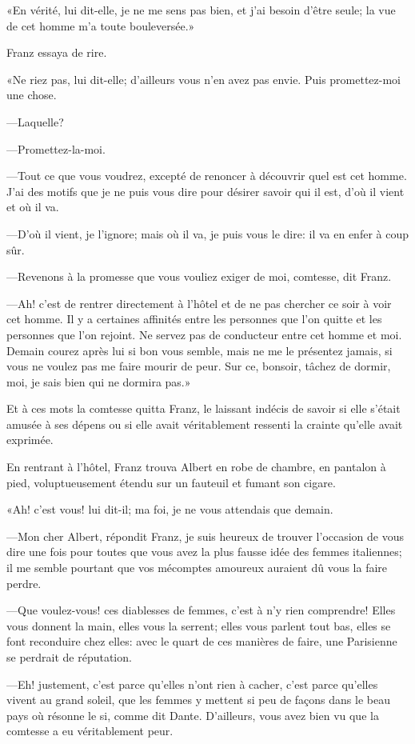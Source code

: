«En vérité, lui dit-elle, je ne me sens pas bien, et j'ai besoin d'être seule; la vue de cet homme m'a toute bouleversée.» 

Franz essaya de rire. 

«Ne riez pas, lui dit-elle; d'ailleurs vous n'en avez pas envie. Puis promettez-moi une chose. 

—Laquelle? 

—Promettez-la-moi. 

—Tout ce que vous voudrez, excepté de renoncer à découvrir quel est cet homme. J'ai des motifs que je ne puis vous dire pour désirer savoir qui il est, d'où il vient et où il va.  

—D'où il vient, je l'ignore; mais où il va, je puis vous le dire: il va en enfer à coup sûr. 

—Revenons à la promesse que vous vouliez exiger de moi, comtesse, dit Franz. 

—Ah! c'est de rentrer directement à l'hôtel et de ne pas chercher ce soir à voir cet homme. Il y a certaines affinités entre les personnes que l'on quitte et les personnes que l'on rejoint. Ne servez pas de conducteur entre cet homme et moi. Demain courez après lui si bon vous semble, mais ne me le présentez jamais, si vous ne voulez pas me faire mourir de peur. Sur ce, bonsoir, tâchez de dormir, moi, je sais bien qui ne dormira pas.»  

Et à ces mots la comtesse quitta Franz, le laissant indécis de savoir si elle s'était amusée à ses dépens ou si elle avait véritablement ressenti la crainte qu'elle avait exprimée. 

En rentrant à l'hôtel, Franz trouva Albert en robe de chambre, en pantalon à pied, voluptueusement étendu sur un fauteuil et fumant son cigare. 

«Ah! c'est vous! lui dit-il; ma foi, je ne vous attendais que demain. 

—Mon cher Albert, répondit Franz, je suis heureux de trouver l'occasion de vous dire une fois pour toutes que vous avez la plus fausse idée des femmes italiennes; il me semble pourtant que vos mécomptes amoureux auraient dû vous la faire perdre. 

—Que voulez-vous! ces diablesses de femmes, c'est à n'y rien comprendre! Elles vous donnent la main, elles vous la serrent; elles vous parlent tout bas, elles se font reconduire chez elles: avec le quart de ces manières de faire, une Parisienne se perdrait de réputation. 

—Eh! justement, c'est parce qu'elles n'ont rien à cacher, c'est parce qu'elles vivent au grand soleil, que les femmes y mettent si peu de façons dans le beau pays où résonne le si, comme dit Dante. D'ailleurs, vous avez bien vu que la comtesse a eu véritablement peur. 

